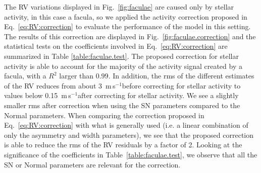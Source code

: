 \documentclass{aa}
\def\ms{\hbox{\,m\,s$^{-1}$}}         %
\begin{document}
The RV variations displayed in Fig.~\ref{fig:faculae} are caused only by stellar activity, in this case a facula, so we applied the activity correction proposed in Eq.~\eqref{eq:RV:correction} to evaluate the performance of the model in this setting.
The results of this correction are displayed in Fig.~\ref{fig:faculae.correction} and the statistical tests on the coefficients involved in Eq.~\eqref{eq:RV:correction} are summarized in Table \ref{table:faculae.test}. 
The proposed correction for stellar activity is able to account for the majority of the activity signal created by a facula, with a $R^2$ larger than $0.99$. 
In addition, the rms of the different estimates of the RV reduces from about 3 \ms before correcting for stellar activity to values below 0.15 \ms after correcting for stellar activity.
We see a slightly smaller rms after correction when using the SN parameters compared to the Normal parameters.
When comparing the correction proposed in Eq.~\eqref{eq:RV:correction} with what is generally used (i.e. a linear combination of only the asymmetry and width parameters), we see that the proposed correction is able to reduce the rms of the RV residuals by a factor of 2. Looking at the significance of the coefficients in Table~\ref{table:faculae.test}, we observe that all the SN or Normal parameters are relevant for the correction.
\end{document}
